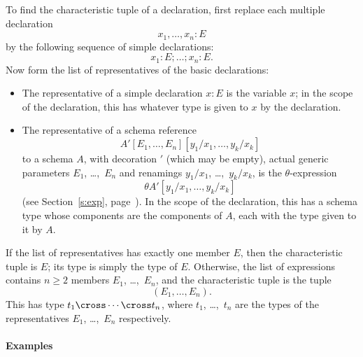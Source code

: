 To find the characteristic tuple of a declaration, first replace each
multiple declaration
\[ x_1, \ldots, x_n: E \]
by the following sequence of simple declarations:
\[ x_1: E; \ldots; x_n: E. \]
Now form the list of representatives of the basic declarations:
\begin{itemize}
\item The representative of a simple declaration $x: E$ is the
        variable $x$; in the scope of the declaration, this has
	whatever type is given to $x$ by the declaration.

\item The representative of a schema reference 
	\[ A'[E_1, \ldots, E_n][y_1/x_1, \ldots, y_k/x_k] \]
	to a schema $A$, with decoration ${}'$ (which may be empty),
	actual generic parameters $E_1$, \dots,~$E_n$ and renamings
	$y_1/x_1$, \dots,~$y_k/x_k$, is the $\theta$-expression 
	\[ \theta A'[y_1/x_1, \ldots, y_k/x_k] \]
	(see Section~\ref{s:exp}, page~\pageref{p:theta}). 
	In the scope of the declaration, this has a schema type
	whose components are the components of $A$, each with the
	type given to it by $A$.
\end{itemize}
If the list of representatives has exactly one member $E$, then
the characteristic tuple is $E$; its type is simply the type of $E$.
Otherwise, the list of expressions contains
$n \geq 2$ members $E_1$, \dots,~$E_n$, and the characteristic tuple
is the tuple
\[ (E_1, \ldots, E_n). \]
This has type $t_1 \cross \cdots \cross t_n$, where $t_1$, \dots,~$t_n$
are the types of the representatives $E_1$, \dots,~$E_n$ respectively.

\paragraph{Examples}

